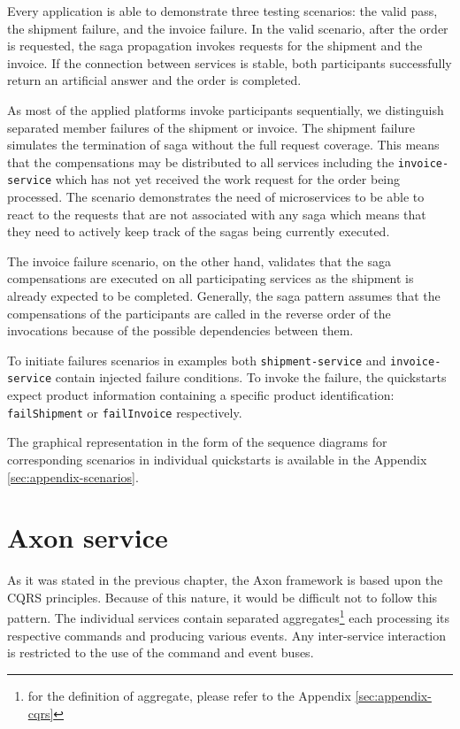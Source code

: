 \documentclass[oneside,
  digital, %
  table,   %
  lof,     %
  lot,     %
]{fithesis3}
\begin{document}
Every application is able to demonstrate three testing scenarios: the valid pass, the shipment failure, and the invoice failure. In the valid scenario, after the order is requested, the saga propagation invokes requests for the shipment and the invoice. If the connection between services is stable, both participants successfully return an artificial answer and the order is completed. 

As most of the applied platforms invoke participants sequentially, we distinguish separated member failures of the shipment or invoice. The shipment failure simulates the termination of saga without the full request coverage. This means that the compensations may be distributed to all services including the \texttt{invoice-service} which has not yet received the work request for the order being processed. The scenario demonstrates the need of microservices to be able to react to the requests that are not associated with any saga which means that they need to actively keep track of the sagas being currently executed. 

The invoice failure scenario, on the other hand, validates that the saga compensations are executed on all participating services as the shipment is already expected to be completed. Generally, the saga pattern assumes that the compensations of the participants are called in the reverse order of the invocations because of the possible dependencies between them.

To initiate failures scenarios in examples both \texttt{shipment-service} and \texttt{invoice-service} contain injected failure conditions. To invoke the failure, the quickstarts expect product information containing a specific product identification: \texttt{failShipment} or \texttt{failInvoice} respectively. 

The graphical representation in the form of the sequence diagrams for corresponding scenarios in individual quickstarts is available in the Appendix \ref{sec:appendix-scenarios}.

\section{Axon service}

As it was stated in the previous chapter, the Axon framework is based upon the CQRS principles. Because of this nature, it would be difficult not to follow this pattern. The individual services contain separated aggregates\footnote{for the definition of aggregate, please refer to the Appendix \ref{sec:appendix-cqrs}} each processing its respective commands and producing various events. Any inter-service interaction is restricted to the use of the command and event buses.
\end{document}
